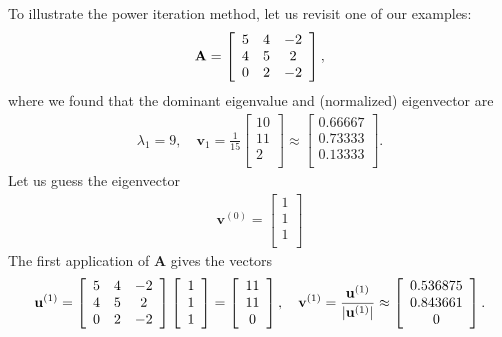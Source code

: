 To illustrate the power iteration method, let us revisit one of our examples:
\begin{align}
  \mathbf{A} =
  \left[ \begin{array}{c c c}
   5 &  4 & -2 \\
   4 &  5 &  2 \\
   0 &  2 & -2 \\ \end{array} \right] , \nonumber
\end{align}
where we found that the dominant eigenvalue and (normalized) eigenvector are
\begin{align}
  \lambda_1 = 9, \quad \mathbf{v}_1 = \frac{1}{15} \left[ \begin{array}{c} 10 \\ 11 \\ 2 \\ \end{array} \right] 
  \approx  \left[ \begin{array}{c} 0.66667 \\ 0.73333 \\ 0.13333 \\ \end{array} \right]. \nonumber
\end{align}
Let us guess the eigenvector
\begin{align}
  \mathbf{v}^{(0)} = \left[ \begin{array}{c} 1 \\ 1 \\ 1 \\ \end{array} \right] \nonumber
\end{align}
The first application of $\mathbf{A}$ gives the vectors
\begin{align}
  \mathbf{u}^{(1)} =   \left[ \begin{array}{c c c}
   5 &  4 & -2 \\
   4 &  5 &  2 \\
   0 &  2 & -2 \\ \end{array} \right]
   \left[ \begin{array}{c} 1 \\ 1 \\ 1 \\ \end{array} \right] =
   \left[ \begin{array}{c} 11 \\ 11 \\ 0 \\ \end{array} \right] , \quad
   \mathbf{v}^{(1)} =  \frac{\mathbf{u}^{(1)}}{| \mathbf{u}^{(1)} |} \approx \left[ \begin{array}{c} 0.536875  \\ 0.843661  \\ 0 \\ \end{array} \right] . \nonumber
\end{align}
